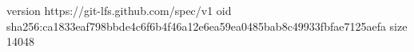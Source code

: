 version https://git-lfs.github.com/spec/v1
oid sha256:ca1833eaf798bbde4c6f6b4f46a12e6ea59ea0485bab8c49933fbfae7125aefa
size 14048
